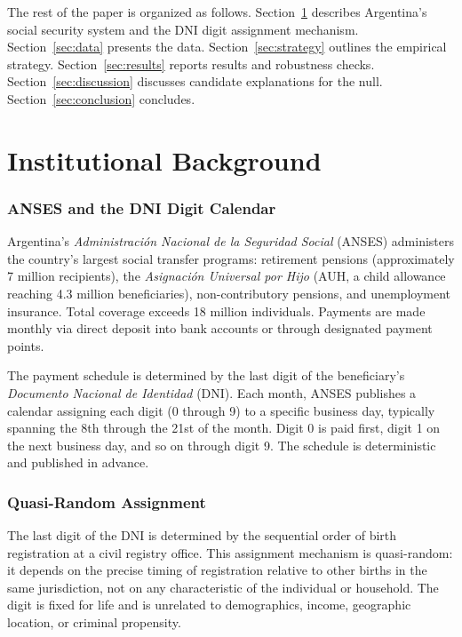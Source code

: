 \documentclass[12pt]{article}
\begin{document}
The rest of the paper is organized as follows. Section~\ref{sec:background} describes Argentina's social security system and the DNI digit assignment mechanism. Section~\ref{sec:data} presents the data. Section~\ref{sec:strategy} outlines the empirical strategy. Section~\ref{sec:results} reports results and robustness checks. Section~\ref{sec:discussion} discusses candidate explanations for the null. Section~\ref{sec:conclusion} concludes.


\section{Institutional Background}
\label{sec:background}

\subsubsection*{ANSES and the DNI Digit Calendar} Argentina's \textit{Administraci\'on Nacional de la Seguridad Social} (ANSES) administers the country's largest social transfer programs: retirement pensions (approximately 7 million recipients), the \textit{Asignaci\'on Universal por Hijo} (AUH, a child allowance reaching 4.3 million beneficiaries), non-contributory pensions, and unemployment insurance. Total coverage exceeds 18 million individuals. Payments are made monthly via direct deposit into bank accounts or through designated payment points.

The payment schedule is determined by the last digit of the beneficiary's \textit{Documento Nacional de Identidad} (DNI). Each month, ANSES publishes a calendar assigning each digit (0 through 9) to a specific business day, typically spanning the 8th through the 21st of the month. Digit 0 is paid first, digit 1 on the next business day, and so on through digit 9. The schedule is deterministic and published in advance.

\subsubsection*{Quasi-Random Assignment} The last digit of the DNI is determined by the sequential order of birth registration at a civil registry office. This assignment mechanism is quasi-random: it depends on the precise timing of registration relative to other births in the same jurisdiction, not on any characteristic of the individual or household. The digit is fixed for life and is unrelated to demographics, income, geographic location, or criminal propensity.
\end{document}
